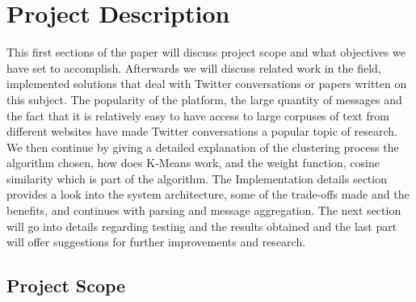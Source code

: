 \section{Project Description}
\label{sec:proj}

This first sections of the paper will discuss project scope and what objectives we have set to accomplish. Afterwards we will discuss related work in the field, implemented solutions that deal with Twitter conversations or papers written on this subject. The popularity of the platform, the large quantity of messages and the fact that it is relatively easy to have access to large corpuses of text from different websites have made Twitter conversations a popular topic of research. We then continue by giving a detailed explanation of the clustering process the algorithm chosen, how does K-Means work, and the weight function, cosine similarity which is part of the algorithm. The Implementation details section provides a look into the system architecture, some of the trade-offs made and the benefits, and continues with parsing and message aggregation. The next section will go into details regarding testing and the results obtained and the last part will offer suggestions for further improvements and research.

\subsection{Project Scope}
\label{sub-sec:proj-scope}


